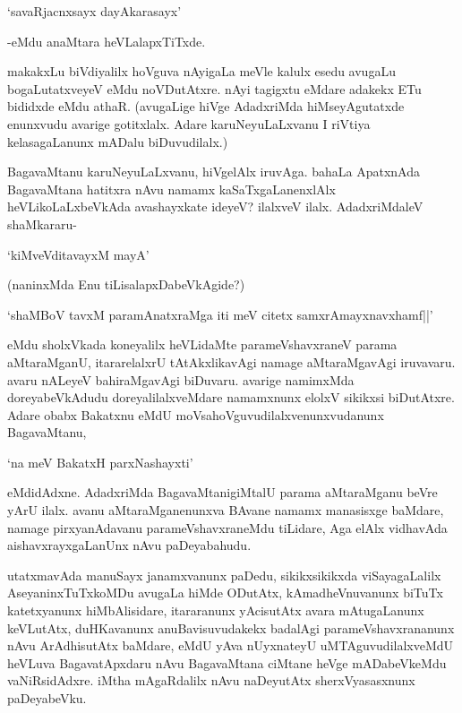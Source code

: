 \begin{shloka}
`savaRjacnxsayx dayAkarasayx'
\end{shloka}

-eMdu anaMtara heVLalapxTiTxde.

makakxLu biVdiyalilx hoVguva nAyigaLa meVle kalulx esedu avugaLu bogaLutatxveyeV eMdu noVDutAtxre. nAyi tagigxtu eMdare adakekx ETu bididxde eMdu athaR. (avugaLige hiVge AdadxriMda hiMseyAgutatxde enunxvudu avarige gotitxlalx. Adare karuNeyuLaLxvanu I riVtiya kelasagaLanunx mADalu biDuvudilalx.) 

BagavaMtanu karuNeyuLaLxvanu, hiVgelAlx iruvAga. bahaLa ApatxnAda BagavaMtana hatitxra nAvu namamx kaSaTxgaLanenxlAlx heVLikoLaLxbeVkAda avashayxkate ideyeV? ilalxveV ilalx. AdadxriMdaleV shaMkararu-

\begin{shloka}
`kiMveVditavayxM mayA'
\end{shloka}
(naninxMda Enu tiLisalapxDabeVkAgide?)

\begin{shloka}
`shaMBoV tavxM paramAnatxraMga iti meV citetx samxrAmayxnavxhamf||'
\end{shloka}

eMdu sholxVkada koneyalilx heVLidaMte parameVshavxraneV parama aMtaraMganU, itararelalxrU tAtAkxlikavAgi namage aMtaraMgavAgi iruvavaru. avaru nALeyeV bahiraMgavAgi biDuvaru. avarige namimxMda doreyabeVkAdudu doreyalilalxveMdare namamxnunx elolxV sikikxsi biDutAtxre. Adare obabx Bakatxnu eMdU moVsahoVguvudilalxvenunxvudanunx BagavaMtanu,

\begin{shloka}
`na meV BakatxH parxNashayxti'
\end{shloka}

eMdidAdxne. AdadxriMda BagavaMtanigiMtalU parama aMtaraMganu beVre yArU ilalx. avanu aMtaraMganenunxva BAvane namamx manasisxge baMdare, namage pirxyanAdavanu parameVshavxraneMdu tiLidare, Aga elAlx vidhavAda aishavxrayxgaLanUnx nAvu paDeyabahudu.

utatxmavAda manuSayx janamxvanunx paDedu, sikikxsikikxda viSayagaLalilx AseyaninxTuTxkoMDu avugaLa hiMde ODutAtx, kAmadheVnuvanunx biTuTx katetxyanunx hiMbAlisidare, itararanunx yAcisutAtx avara mAtugaLanunx keVLutAtx, duHKavanunx anuBavisuvudakekx badalAgi parameVshavxrananunx nAvu ArAdhisutAtx baMdare, eMdU yAva nUyxnateyU uMTAguvudilalxveMdU heVLuva BagavatApxdaru nAvu BagavaMtana ciMtane heVge mADabeVkeMdu vaNiRsidAdxre. iMtha mAgaRdalilx nAvu naDeyutAtx sherxVyasasxnunx paDeyabeVku.


\endchapter
